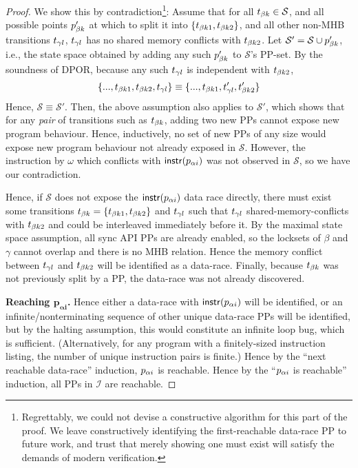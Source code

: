 \begin{proof}
We show this by contradiction\footnote{
Regrettably, we could not devise a constructive algorithm for this part of the proof.
We leave constructively identifying the first-reachable data-race PP to future work,
and trust that merely showing one must exist will satisfy the demands of modern verification.}:
%
Assume that for all $t_{\beta{}k} \in \mathcal{S}$,
and all possible points $p_{\beta{}k}'$ at which to split it into $\{t_{\beta{}k1},t_{\beta{}k2}\}$,
and all other non-MHB transitions $t_{\gamma{}l}$,
$t_{\gamma{}l}$ has no shared memory conflicts with $t_{\beta{}k2}$.
%
Let $\mathcal{S}' = \mathcal{S} \cup p_{\beta{}k}'$, i.e., the state space obtained by adding any such $p_{\beta{}k}'$ to $\mathcal{S}$'s PP-set.
By the soundness of DPOR, because any such $t_{\gamma{}l}$ is independent with $t_{\beta{}k2}$,
\[
	\{..., t_{\beta{}k1}, t_{\beta{}k2}, t_{\gamma{}l}\}
	\equiv
	\{..., t_{\beta{}k1}, t_{\gamma{}l}', t_{\beta{}k2}'\}
\]
Hence, $\mathcal{S} \equiv \mathcal{S}'$. %
Then, the above assumption also applies to $\mathcal{S}'$,
which shows that for any {\em pair} of transitions such as $t_{\beta{}k}$, adding two new PPs cannot expose new program behaviour.
Hence, inductively, no set of new PPs of any size would expose new program behaviour not already exposed in $\mathcal{S}$.
However, the instruction by $\omega$ which conflicts with $\mathsf{instr}(p_{\alpha{}i})$ was not observed in $\mathcal{S}$,
so we have our contradiction.

Hence, if $\mathcal{S}$ does not expose the $\mathsf{instr}(p_{\alpha{}i})$ data race directly,
there must exist some transitions $t_{\beta{}k} = \{t_{\beta{}k1},t_{\beta{}k2}\}$ and $t_{\gamma{}l}$ such that $t_{\gamma{}l}$ shared-memory-conflicts with $t_{\beta{}k2}$ and could be interleaved immediately before it.
By the maximal state space assumption, all sync API PPs are already enabled, so the locksets of $\beta$ and $\gamma$ cannot overlap and there is no MHB relation.
Hence the memory conflict between $t_{\gamma{}l}$ and $t_{\beta{}k2}$ will be identified as a data-race.
Finally, because $t_{\beta{}k}$ was not previously split by a PP, the data-race was not already discovered.

{\bf Reaching $\mathbf{p_{\alpha{}i}}$.}
Hence either a data-race with $\mathsf{instr}(p_{\alpha{}i})$ will be identified,
or an infinite/nonterminating sequence of other unique data-race PPs will be identified,
but by the halting assumption, this would constitute an infinite loop bug, which is sufficient.
(Alternatively, for any program with a finitely-sized instruction listing, the number of unique instruction pairs is finite.)
Hence by the ``next reachable data-race'' induction, $p_{\alpha{}i}$ is reachable.
Hence by the ``$p_{\alpha{}i}$ is reachable'' induction, all PPs in $\mathcal{I}$ are reachable.
\end{proof}


